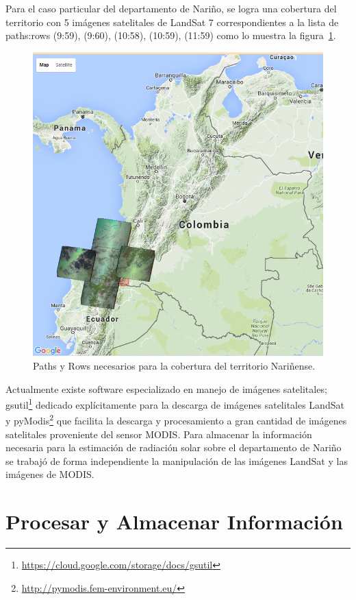 Para el caso particular del departamento de Nariño, se logra una cobertura del territorio con 5 imágenes satelitales de LandSat 7 correspondientes a 
la lista de paths:rows (9:59), (9:60), (10:58), (10:59), (11:59) como lo muestra la figura~\ref{fig:nl7}.
\begin{figure}[htb]
  \centering 
  \includegraphics[scale=0.4]{pictures/nl7.png}
  \caption{Paths y Rows necesarios para la cobertura del territorio Nariñense.} 
  \label{fig:nl7}
\end{figure}

Actualmente existe software especializado en manejo de imágenes satelitales; gsutil\footnote{\url{https://cloud.google.com/storage/docs/gsutil}} 
dedicado explícitamente para la descarga de imágenes satelitales LandSat y pyModis\footnote{\url{http://pymodis.fem-environment.eu/}} que facilita 
la descarga y procesamiento a gran cantidad de imágenes satelitales proveniente del sensor MODIS. Para almacenar la información necesaria para 
la estimación de radiación solar sobre el departamento de Nariño se trabajó de forma independiente la manipulación de las imágenes LandSat y 
las imágenes de MODIS. 
\newpage
\section{Procesar y Almacenar Información}

